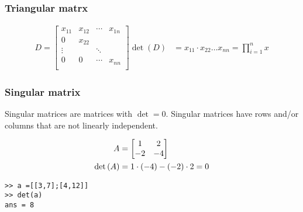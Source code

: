\subsubsection{Triangular matrx}
\begin{align*}
    D = \begin{bmatrix}
        x_{11} & x_{12} & \cdots & x_{1n} \\
        0      & x_{22} &        &        \\
        \vdots &        & \ddots          \\
        0      & 0      & \cdots & x_{nn} \\
    \end{bmatrix} \det(D) & = x_{11} \cdot x_{22} \dots x_{nn} = \prod_{i=1}^n x_{}
\end{align*}
\subsubsection{Singular matrix}
Singular matrices are matrices with \( \det = 0 \).
Singular matrices have rows and/or columns that are not linearly independent.
\begin{example}
    \begin{align*}
        A               & = \begin{bmatrix}
            1 & 2 \\ -2 & -4
        \end{bmatrix}     \\
        \det \left( A \right) & = 1 \cdot (-4) - (-2) \cdot 2 = 0
    \end{align*}
\end{example}
\begin{matlab}
    \begin{lstlisting}
>> a =[[3,7];[4,12]]
>> det(a)
ans = 8
\end{lstlisting}
\end{matlab}
